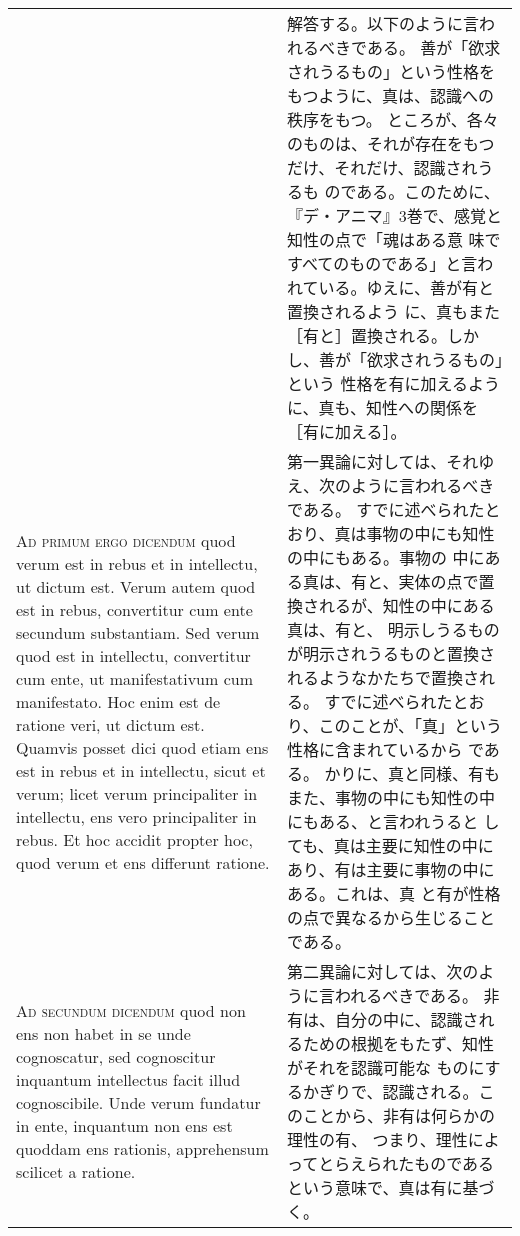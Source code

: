 \documentclass[10pt]{jsarticle} %
\begin{document}
\begin{longtable}{p{21em}p{21em}}
&

解答する。以下のように言われるべきである。
善が「欲求されうるもの」という性格をもつように、真は、認識への秩序をもつ。
 ところが、各々のものは、それが存在をもつだけ、それだけ、認識されうるも
 のである。このために、『デ・アニマ』3巻で、感覚と知性の点で「魂はある意
 味ですべてのものである」と言われている。ゆえに、善が有と置換されるよう
 に、真もまた［有と］置換される。しかし、善が「欲求されうるもの」という
 性格を有に加えるように、真も、知性への関係を［有に加える］。

\\


{\scshape Ad primum ergo dicendum} quod verum est in rebus et in
 intellectu, ut dictum est. Verum autem quod est in rebus, convertitur
 cum ente secundum substantiam. Sed verum quod est in intellectu,
 convertitur cum ente, ut manifestativum cum manifestato. Hoc enim est
 de ratione veri, ut dictum est. Quamvis posset dici quod etiam ens est
 in rebus et in intellectu, sicut et verum; licet verum principaliter in
 intellectu, ens vero principaliter in rebus. Et hoc accidit propter
 hoc, quod verum et ens differunt ratione.


&

第一異論に対しては、それゆえ、次のように言われるべきである。
すでに述べられたとおり、真は事物の中にも知性の中にもある。事物の
 中にある真は、有と、実体の点で置換されるが、知性の中にある真は、有と、
 明示しうるものが明示されうるものと置換されるようなかたちで置換される。
 すでに述べられたとおり、このことが、「真」という性格に含まれているから
 である。
かりに、真と同様、有もまた、事物の中にも知性の中にもある、と言われうると
 しても、真は主要に知性の中にあり、有は主要に事物の中にある。これは、真
 と有が性格の点で異なるから生じることである。


\\


{\scshape Ad secundum dicendum} quod non ens non habet in se unde
 cognoscatur, sed cognoscitur inquantum intellectus facit illud
 cognoscibile. Unde verum fundatur in ente, inquantum non ens est
 quoddam ens rationis, apprehensum scilicet a ratione.


&

第二異論に対しては、次のように言われるべきである。
非有は、自分の中に、認識されるための根拠をもたず、知性がそれを認識可能な
 ものにするかぎりで、認識される。このことから、非有は何らかの理性の有、
 つまり、理性によってとらえられたものであるという意味で、真は有に基づく。
 



\end{longtable}
\end{document}
